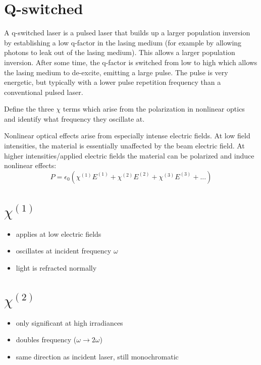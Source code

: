 \documentclass{hw}
\begin{document}
\part{Q-switched}

A q-switched laser is a pulsed laser that builds up a larger population inversion by establishing a low q-factor in the lasing medium (for example by allowing photons to leak out of the lasing medium). This allows a larger population inversion. After some time, the q-factor is switched from low to high which allows the lasing medium to de-excite, emitting a large pulse. The pulse is very energetic, but typically with a lower pulse repetition frequency than a conventional pulsed laser.

\problem{}

Define the three $\chi$ terms which arise from the polarization in nonlinear optics and identify what frequency they oscillate at.

\solution

Nonlinear optical effects arise from especially intense electric fields. At low field intensities, the material is essentially unaffected by the beam electric field. At higher intensities/applied electric fields the material can be polarized and induce nonlinear effects:
$$
    P = \epsilon_0 \left( \chi^{(1)} E^{(1)} + \chi^{(2)} E^{(2)} + \chi^{(3)} E^{(3)} + ... \right)
$$

\part{$\chi^{\left(1\right)}$}

\begin{itemize}
    \item applies at low electric fields
    \item oscillates at incident frequency $\omega$
    \item light is refracted normally
\end{itemize}

\part{$\chi^{\left(2\right)}$}

\begin{itemize}
    \item only significant at high irradiances
    \item doubles frequency ($\omega \rightarrow 2\omega$)
    \item same direction as incident laser, still monochromatic
\end{itemize}
\end{document}
